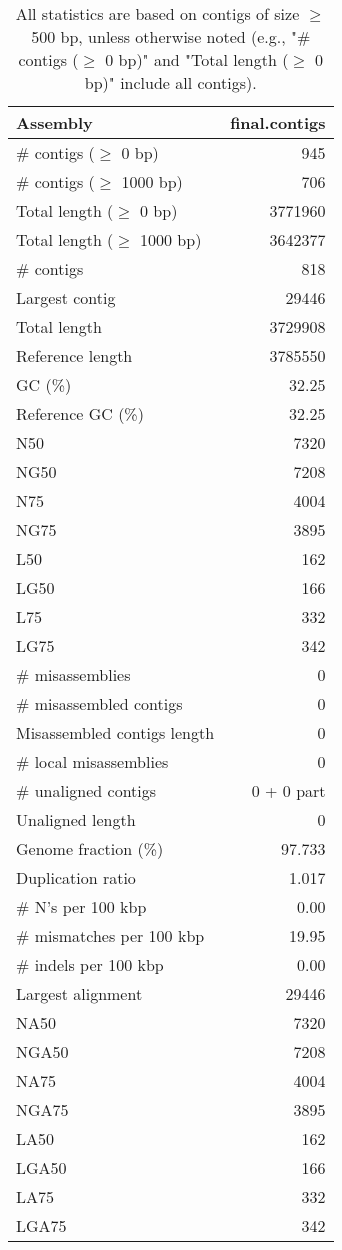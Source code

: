 \documentclass[12pt,a4paper]{article}
\begin{document}
\begin{table}[ht]
\begin{center}
\caption{All statistics are based on contigs of size $\geq$ 500 bp, unless otherwise noted (e.g., "\# contigs ($\geq$ 0 bp)" and "Total length ($\geq$ 0 bp)" include all contigs).}
\begin{tabular}{|l*{1}{|r}|}
\hline
Assembly & final.contigs \\ \hline
\# contigs ($\geq$ 0 bp) & 945 \\ \hline
\# contigs ($\geq$ 1000 bp) & 706 \\ \hline
Total length ($\geq$ 0 bp) & 3771960 \\ \hline
Total length ($\geq$ 1000 bp) & 3642377 \\ \hline
\# contigs & 818 \\ \hline
Largest contig & 29446 \\ \hline
Total length & 3729908 \\ \hline
Reference length & 3785550 \\ \hline
GC (\%) & 32.25 \\ \hline
Reference GC (\%) & 32.25 \\ \hline
N50 & 7320 \\ \hline
NG50 & 7208 \\ \hline
N75 & 4004 \\ \hline
NG75 & 3895 \\ \hline
L50 & 162 \\ \hline
LG50 & 166 \\ \hline
L75 & 332 \\ \hline
LG75 & 342 \\ \hline
\# misassemblies & 0 \\ \hline
\# misassembled contigs & 0 \\ \hline
Misassembled contigs length & 0 \\ \hline
\# local misassemblies & 0 \\ \hline
\# unaligned contigs & 0 + 0 part \\ \hline
Unaligned length & 0 \\ \hline
Genome fraction (\%) & 97.733 \\ \hline
Duplication ratio & 1.017 \\ \hline
\# N's per 100 kbp & 0.00 \\ \hline
\# mismatches per 100 kbp & 19.95 \\ \hline
\# indels per 100 kbp & 0.00 \\ \hline
Largest alignment & 29446 \\ \hline
NA50 & 7320 \\ \hline
NGA50 & 7208 \\ \hline
NA75 & 4004 \\ \hline
NGA75 & 3895 \\ \hline
LA50 & 162 \\ \hline
LGA50 & 166 \\ \hline
LA75 & 332 \\ \hline
LGA75 & 342 \\ \hline
\end{tabular}
\end{center}
\end{table}
\end{document}
